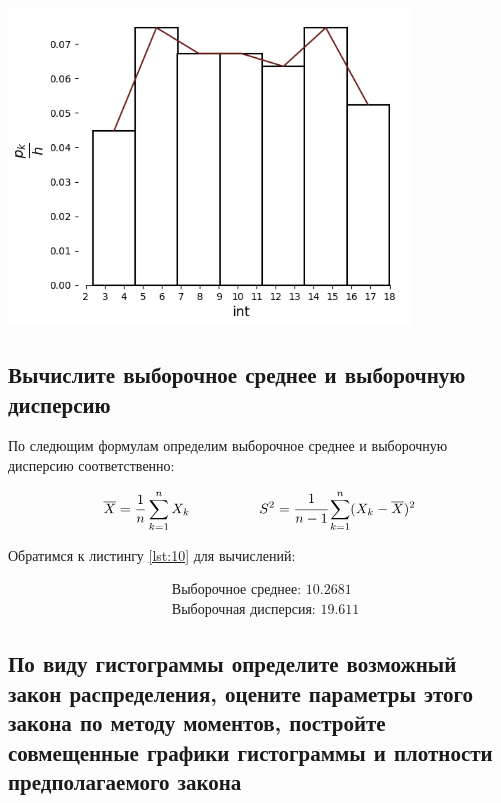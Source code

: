 \documentclass[a4paper, 14pt]{extarticle}
\begin{document}
\begin{center}
    \includegraphics[width=0.8\textwidth]{LW1_15_1}
\end{center}

\subsection{Вычислите выборочное среднее и выборочную дисперсию}

По следющим формулам определим выборочное среднее и выборочную дисперсию 
соответственно:

\begin{equation*}
    \overline{X} = \frac{1}{n} \sum_{k=1}^{n} X_k \hspace{50pt}
    S^2 = \cfrac{1}{n - 1} \sum_{k=1}^{n} (X_k - \overline{X})^2
\end{equation*}

\vspace{15pt}

Обратимся к листингу \ref{lst:10} для вычислений:

\vspace{-15pt}

\begin{align*}
    & \text{Выборочное среднее: } 10.2681 \\
    & \text{Выборочная дисперсия: }  19.611
\end{align*}

\subsection{По виду гистограммы определите возможный закон распределения, 
оцените параметры этого закона по методу моментов, постройте совмещенные 
графики гистограммы и плотности предполагаемого закона}
\end{document}
